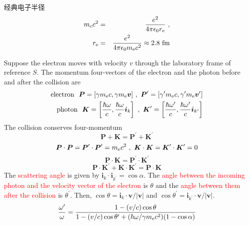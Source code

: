 \documentclass[12pt,a4paper]{article}
\renewcommand{\vec}[1]{\boldsymbol{#1}}
\begin{document}
经典电子半径
\begin{eqnarray*}
m_{\rm e} c^2 &=& \frac{e^2}{4\pi \epsilon_0 r_{\rm e}} ~, \\
r_{\rm e} &=& \frac{e^2}{4\pi \epsilon_0 m_{\rm e} c^2} \approx 2.8 ~\rm fm
\end{eqnarray*}

\cite{2011hea..book.....L} Suppose the electron moves with velocity $v$ through the laboratory frame of reference $S$. The momentum four-vectors of the electron and the photon before and after the collision are
\begin{eqnarray*}
{\rm electron}~~ \vec{P} = [\gamma m_{\rm e} c, \gamma m_{\rm e} \vec{v}] ~,~  \vec{P}^{\prime} = [\gamma^{\prime} m_{\rm e} c, \gamma^{\prime} m_{\rm e} \vec{v}^{\prime}]  \\
{\rm photon}~~ \vec{K} = \left[\frac{\hbar \omega}{c}, \frac{\hbar \omega}{c} \vec{i}_k \right]  ~,~ \vec{K}^{\prime} = \left[\frac{\hbar \omega^{\prime} }{c}, \frac{\hbar \omega^{\prime} }{c} \vec{i}_{k^{\prime}} \right]
\end{eqnarray*}
The collision conserves four-momentum 
\begin{equation*}
\vec{P} +\vec{K} = \vec{P}^{\prime} +\vec{K}^{\prime}
\end{equation*}
\begin{equation*}
\vec{P} \cdot\vec{P} = \vec{P}^{\prime}\cdot \vec{P}^{\prime} = m_{\rm e} c^2 ~,~ \vec{K} \cdot\vec{K} = \vec{K}^{\prime}\cdot \vec{K}^{\prime} = 0
\end{equation*}
\begin{equation*}
\vec{P} \cdot\vec{K} = \vec{P}^{\prime}\cdot \vec{K}^{\prime}
\end{equation*}
\begin{equation*}
\vec{P} \cdot\vec{K}^{\prime} + \vec{K}\cdot \vec{K}^{\prime} = \vec{P} \cdot\vec{K}
\end{equation*}
The \textcolor{red}{scattering angle} is given by $\vec{i}_k \cdot \vec{i}_{k^{\prime}} = \cos \alpha$. The \textcolor{red}{angle between the incoming photon and the velocity vector of the electron} is $\theta$ and the \textcolor{red}{angle between them after the collision} is $\theta^{\prime}$. Then, $\cos \theta = \vec{i}_k \cdot \vec{v}/|\vec{v}|$ and $\cos \theta^{\prime} = \vec{i}_{k^{\prime}} \cdot \vec{v}/|\vec{v}|$.
\begin{equation}
\frac{\omega^{\prime}}{\omega} = \frac{1-(v/c) \cos\theta}{1-(v/c)\cos \theta^{\prime} +(\hbar\omega/\gamma m_{\rm e} c^2)(1-\cos \alpha)}
\end{equation}
\end{document}
